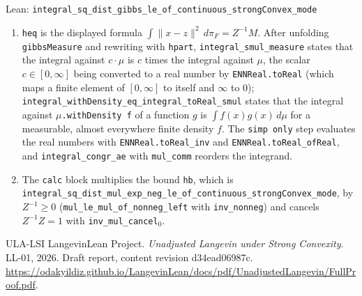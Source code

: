 \documentclass[11pt,a4paper]{article}
\begin{document}
\begin{leanbox}{Lean: \texttt{integral\_\allowbreak{}sq\_\allowbreak{}dist\_\allowbreak{}gibbs\_\allowbreak{}le\_\allowbreak{}of\_\allowbreak{}continuous\_\allowbreak{}strongConvex\_\allowbreak{}mode}}
\begin{enumerate}
\item \texttt{heq} is the displayed formula \(\int\|x-z\|^2\,d\pi_F=Z^{-1}M\). After unfolding \texttt{gibbs\allowbreak{}Measure} and rewriting with \texttt{hpart}, \texttt{integral\_\allowbreak{}smul\_\allowbreak{}measure} states that the integral against \(c\cdot\mu\) is \(c\) times the integral against \(\mu\), the scalar \(c\in[0,\infty]\) being converted to a real number by \texttt{ENNReal.\allowbreak{}to\allowbreak{}Real} (which maps a finite element of \([0,\infty]\) to itself and \(\infty\) to \(0\)); \texttt{integral\_\allowbreak{}with\allowbreak{}Density\_\allowbreak{}eq\_\allowbreak{}integral\_\allowbreak{}to\allowbreak{}Real\_\allowbreak{}smul} states that the integral against \texttt{\ensuremath{\mu}.\allowbreak{}with\allowbreak{}Density f} of a function \(g\) is \(\int f(x)g(x)\,d\mu\) for a measurable, almost everywhere finite density \(f\). The \texttt{simp only} step evaluates the real numbers with \texttt{ENNReal.\allowbreak{}to\allowbreak{}Real\_\allowbreak{}inv} and \texttt{ENNReal.\allowbreak{}to\allowbreak{}Real\_\allowbreak{}of\allowbreak{}Real}, and \texttt{integral\_\allowbreak{}congr\_\allowbreak{}ae} with \texttt{mul\_\allowbreak{}comm} reorders the integrand.

\item The \texttt{calc} block multiplies the bound \texttt{hb}, which is \texttt{integral\_\allowbreak{}sq\_\allowbreak{}dist\_\allowbreak{}mul\_\allowbreak{}exp\_\allowbreak{}neg\_\allowbreak{}le\_\allowbreak{}of\_\allowbreak{}continuous\_\allowbreak{}strong\allowbreak{}Convex\_\allowbreak{}mode}, by \(Z^{-1}\ge0\) (\texttt{mul\_\allowbreak{}le\_\allowbreak{}mul\_\allowbreak{}of\_\allowbreak{}nonneg\_\allowbreak{}left} with \texttt{inv\_\allowbreak{}nonneg}) and cancels \(Z^{-1}Z=1\) with \texttt{inv\_\allowbreak{}mul\_\allowbreak{}cancel\ensuremath{{}_{0}}}.

\end{enumerate}
\end{leanbox}

\begin{thebibliography}{ULA-LSI}
LangevinLean Project. \emph{Unadjusted Langevin under Strong Convexity}. LL-01, 2026. Draft report, content revision d34ead06987c. \url{https://odakyildiz.github.io/LangevinLean/docs/pdf/UnadjustedLangevin/FullProof.pdf}.
\end{thebibliography}
\end{document}
